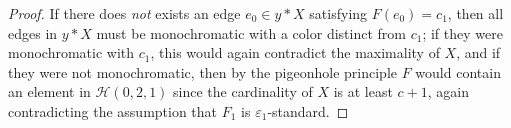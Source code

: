 \documentclass[a4paper,11pt]{article}
\numberwithin{equation}{section}
\newcommand{\mH}{\mathcal{H}}
\begin{document}
\begin{proof}
    If there does \emph{not} exists an edge $e_0 \in y \ast X$ satisfying $F(e_0) = c_1$, then all edges in $y \ast X$ must be monochromatic with a color distinct from $c_1$; if they were monochromatic with $c_1$, this would again contradict the maximality of $X$, and if they were not monochromatic, then by the pigeonhole principle $F$ would contain an element in $\mH(0,2,1)$ since the cardinality of $X$ is at least $c+1$, again contradicting the assumption that $F_1$ is $\varepsilon_1$-standard.
%
%
%
%
%
%
%
\end{proof} 
\end{document}

